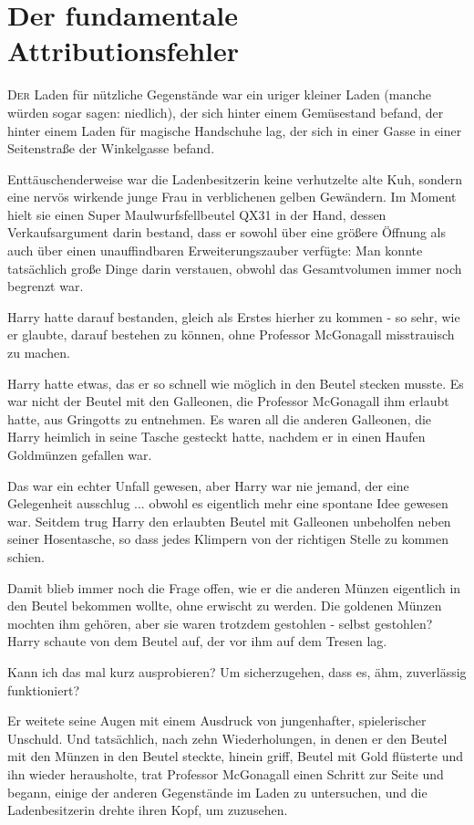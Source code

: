 \chapter{Der fundamentale Attributionsfehler}

\lettrine{D}{er} Laden für nützliche Gegenstände war ein uriger kleiner Laden
(manche würden sogar sagen: niedlich), der sich hinter einem Gemüsestand befand,
der hinter einem Laden für magische Handschuhe lag, der sich in einer Gasse in
einer Seitenstraße der Winkelgasse befand.

Enttäuschenderweise war die Ladenbesitzerin keine verhutzelte alte Kuh, sondern
eine nervös wirkende junge Frau in verblichenen gelben Gewändern. Im Moment
hielt sie einen Super Maulwurfsfellbeutel QX31 in der Hand, dessen
Verkaufsargument darin bestand, dass er sowohl über eine größere Öffnung als
auch über einen unauffindbaren Erweiterungszauber verfügte: Man konnte
tatsächlich große Dinge darin verstauen, obwohl das Gesamtvolumen immer noch
begrenzt war.

Harry hatte darauf bestanden, gleich als Erstes hierher zu kommen - so sehr, wie
er glaubte, darauf bestehen zu können, ohne Professor McGonagall misstrauisch zu
machen.

Harry hatte etwas, das er so schnell wie möglich in den Beutel stecken musste.
Es war nicht der Beutel mit den Galleonen, die Professor McGonagall ihm erlaubt
hatte, aus Gringotts zu entnehmen. Es waren all die anderen Galleonen, die Harry
heimlich in seine Tasche gesteckt hatte, nachdem er in einen Haufen Goldmünzen
gefallen war.

Das war ein echter Unfall gewesen, aber Harry war nie jemand, der eine
Gelegenheit ausschlug ... obwohl es eigentlich mehr eine spontane Idee gewesen
war. Seitdem trug Harry den erlaubten Beutel mit Galleonen unbeholfen neben
seiner Hosentasche, so dass jedes Klimpern von der richtigen Stelle zu kommen
schien.

Damit blieb immer noch die Frage offen, wie er die anderen Münzen eigentlich in
den Beutel bekommen wollte, ohne erwischt zu werden. Die goldenen Münzen mochten
ihm gehören, aber sie waren trotzdem gestohlen - selbst gestohlen? Harry schaute
von dem Beutel auf, der vor ihm auf dem Tresen lag.

\glqq{}Kann ich das mal kurz ausprobieren? Um sicherzugehen, dass es, ähm,
zuverlässig funktioniert?\grqq{}

Er weitete seine Augen mit einem Ausdruck von jungenhafter, spielerischer
Unschuld. Und tatsächlich, nach zehn Wiederholungen, in denen er den Beutel mit
den Münzen in den Beutel steckte, hinein griff, \glqq{}Beutel mit Gold\grqq{}
flüsterte und ihn wieder herausholte, trat Professor McGonagall einen Schritt
zur Seite und begann, einige der anderen Gegenstände im Laden zu untersuchen,
und die Ladenbesitzerin drehte ihren Kopf, um zuzusehen.


